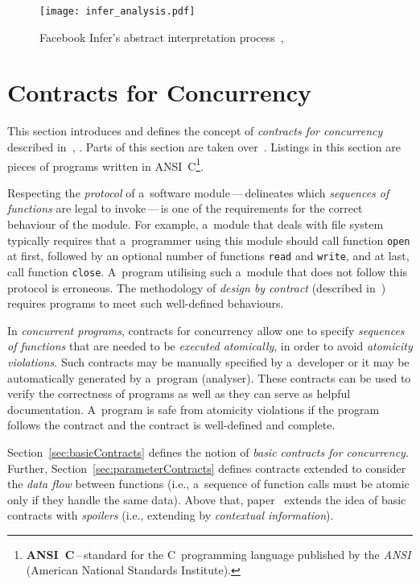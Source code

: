 \begin{figure}[hbt]
    \centering
    \texttt{[image: infer\_analysis.pdf]}
    \caption{
        Facebook Infer's abstract interpretation
        process~\cite{inferAISlides}, \cite{projectPracticeMarcin2018}
    }
    \label{fig:inferAnalysis}
\end{figure}


\section{Contracts for Concurrency}
\label{sec:contracts}

This section introduces and defines the concept of \emph{contracts for
concurrency} described in~\cite{contracts2015}, \cite{contracts2017}. Parts
of this section are taken over~\cite{excel2019FBInfer}. Listings in this
section are pieces of programs written in ANSI~C\footnote{
\textbf{ANSI~C}\,--\,standard for the C~programming language published by
the \emph{ANSI} (American National Standards Institute).}.

Respecting the \emph{protocol} of a~software module\,---\,delineates
which \emph{sequences of functions} are legal to invoke\,---\,is one of the
requirements for the correct behaviour of the module. For example, a~module
that deals with file system typically requires that a~programmer using
this module should call function \texttt{open} at first, followed by an
optional number of functions \texttt{read} and \texttt{write}, and at last,
call function \texttt{close}. A~program utilising such a~module that does
not follow this protocol is erroneous. The methodology of \emph{design by
contract} (described in~\cite{contract}) requires programs to meet
such well-defined behaviours.~\cite{contracts2015}

In \emph{concurrent programs}, contracts for concurrency allow one to specify
\emph{sequences of functions} that are needed to be \emph{executed
atomically}, in order to avoid \emph{atomicity violations}. Such contracts
may be manually specified by a~developer or it may be automatically generated
by a~program (analyser). These contracts can be used to verify the correctness
of programs as well as they can serve as helpful documentation. A~program is
safe from atomicity violations if the program follows the contract and
the contract is well-defined and complete.

Section~\ref{sec:basicContracts} defines the notion of \emph{basic contracts
for concurrency}. Further, Section~\ref{sec:parameterContracts} defines
contracts extended to consider the \emph{data flow} between functions (i.e.,
a~sequence of function calls must be atomic only if they handle the
same data). Above that, paper~\cite{contracts2017} extends the idea
of basic contracts with \emph{spoilers} (i.e., extending by
\emph{contextual information}).


